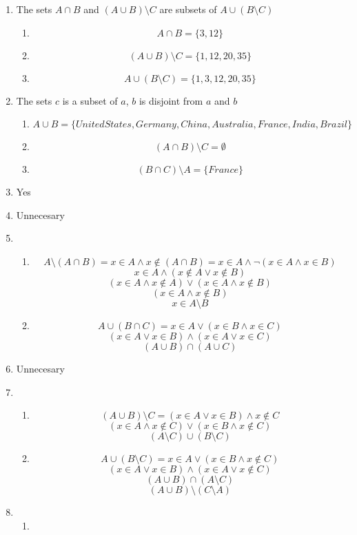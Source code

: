 \begin{enumerate}
    \item The sets $A \cap B$ and $(A \cup B) \setminus C$ are subsets of $A \cup (B \setminus C)$
    \begin{enumerate}
        \item 
            \[A \cap B = \{3,12\}\]
        \item 
            \[(A \cup B) \setminus C = \{1,12,20,35\}\]
        \item 
            \[A \cup (B \setminus C) = \{1,3,12,20,35\}\]
    \end{enumerate}
    \item The sets $c$ is a subset of $a$, $b$ is disjoint from $a$ and $b$
    \begin{enumerate}
        \item 
        \[A \cup B = \{United States, Germany, China, Australia, France, India, Brazil\}\]
        \item 
        \[(A \cap B) \setminus C = \emptyset\]
        \item 
        \[(B \cap C) \setminus A = \{France\}\]
    \end{enumerate}
    \item Yes
    \item Unnecesary
    \item
    \begin{enumerate}
        \item 
        \[A \setminus (A \cap B) = x \in A \land x \notin (A \cap B) = x \in A \land \lnot (x \in A \land x \in B)\]
        \[x \in A \land (x \notin A \lor x \notin B)\]
        \[(x \in A \land x \notin A) \lor (x \in A \land x \notin B)\]
        \[(x \in A \land x \notin B)\]
        \[x \in A \setminus B\]
        \item 
        \[A \cup (B \cap C) = x \in A \lor (x \in B \land x \in C)\]
        \[(x \in A \lor x \in B) \land (x \in A \lor x \in C)\]
        \[(A \cup B) \cap (A \cup C)\]
    \end{enumerate}
    \item Unnecesary
    \item 
    \begin{enumerate}
        \item 
        \[(A \cup B) \setminus C = (x \in A \lor x \in B) \land x \notin C\]
        \[(x \in A \land x\notin C) \lor (x \in B \land x \notin C)\]
        \[(A \setminus C) \cup (B \setminus C)\]
        \item 
        \[A \cup (B \setminus C) = x \in A \lor (x \in B \land x \notin C)\]
        \[(x \in A \lor x \in B) \land (x \in A \lor x \notin C)\]
        \[(A \cup B) \cap (A \setminus C)\]
        \[(A \cup B) \setminus (C \setminus A)\]
    \end{enumerate}
    \item
    \begin{enumerate}
        \item 
    \end{enumerate}

\end{enumerate}
